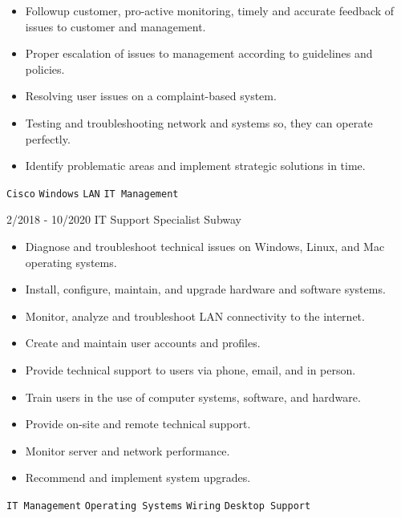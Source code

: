 \documentclass[9pt]{developercv} %
\begin{document}
\begin{entrylist}
{\begin{itemize}[noitemsep,topsep=0pt,parsep=0pt,partopsep=0pt, leftmargin=-1pt]
            \item Followup customer, pro-active monitoring, timely and accurate feedback
            of issues to customer and management.
            \item Proper escalation of issues to management according to guidelines and
            policies.
            \item Resolving user issues on a complaint-based system.
            \item Testing and troubleshooting network and systems so, they can operate
            perfectly.
            \item Identify problematic areas and implement strategic solutions in time.
        \end{itemize} 
        \texttt{Cisco} \slashsep \texttt{Windows} \slashsep \texttt{LAN} \slashsep \texttt{IT Management}}
        \entry
		{2/2018 - 10/2020}
		{IT Support Specialist}
		{Subway}
		{\vspace{-10pt}
        \begin{itemize}[noitemsep,topsep=0pt,parsep=0pt,partopsep=0pt, leftmargin=-1pt]
            \item  Diagnose and troubleshoot technical issues on Windows, Linux, and Mac operating systems.
            \item  Install, configure, maintain, and upgrade hardware and software systems.
            \item  Monitor, analyze and troubleshoot LAN connectivity to the internet.
            \item  Create and maintain user accounts and profiles.
            \item  Provide technical support to users via phone, email, and in person.
            \item  Train users in the use of computer systems, software, and hardware.
            \item  Provide on-site and remote technical support.
            \item  Monitor server and network performance.
            \item  Recommend and implement system upgrades.
        \end{itemize} 
        \texttt{IT Management} \slashsep \texttt{Operating Systems} \slashsep \texttt{Wiring} \slashsep \texttt{Desktop Support}}
	
\end{entrylist}

\vspace{-10 pt}
    \vspace{-6pt}
    
\end{document}
